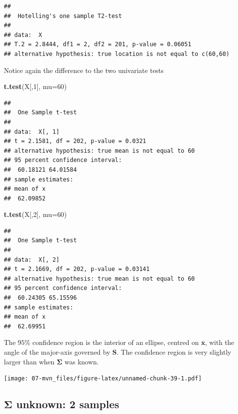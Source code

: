 \documentclass[]{book}
\newenvironment{Shaded}{\begin{snugshade}}{\end{snugshade}}
\newcommand{\DataTypeTok}[1]{\textcolor[rgb]{0.13,0.29,0.53}{#1}}
\newcommand{\DecValTok}[1]{\textcolor[rgb]{0.00,0.00,0.81}{#1}}
\newcommand{\KeywordTok}[1]{\textcolor[rgb]{0.13,0.29,0.53}{\textbf{#1}}}
\newcommand{\NormalTok}[1]{#1}
\theoremstyle{definition}
\theoremstyle{definition}
\theoremstyle{definition}
\theoremstyle{remark}
\begin{document}
\begin{verbatim}
## 
##  Hotelling's one sample T2-test
## 
## data:  X
## T.2 = 2.8444, df1 = 2, df2 = 201, p-value = 0.06051
## alternative hypothesis: true location is not equal to c(60,60)
\end{verbatim}

Notice again the difference to the two univariate tests

\begin{Shaded}
\begin{Highlighting}[]
\KeywordTok{t.test}\NormalTok{(X[,}\DecValTok{1}\NormalTok{], }\DataTypeTok{mu=}\DecValTok{60}\NormalTok{)}
\end{Highlighting}
\end{Shaded}

\begin{verbatim}
## 
##  One Sample t-test
## 
## data:  X[, 1]
## t = 2.1581, df = 202, p-value = 0.0321
## alternative hypothesis: true mean is not equal to 60
## 95 percent confidence interval:
##  60.18121 64.01584
## sample estimates:
## mean of x 
##  62.09852
\end{verbatim}

\begin{Shaded}
\begin{Highlighting}[]
\KeywordTok{t.test}\NormalTok{(X[,}\DecValTok{2}\NormalTok{], }\DataTypeTok{mu=}\DecValTok{60}\NormalTok{)}
\end{Highlighting}
\end{Shaded}

\begin{verbatim}
## 
##  One Sample t-test
## 
## data:  X[, 2]
## t = 2.1669, df = 202, p-value = 0.03141
## alternative hypothesis: true mean is not equal to 60
## 95 percent confidence interval:
##  60.24305 65.15596
## sample estimates:
## mean of x 
##  62.69951
\end{verbatim}

The \(95\)\% confidence region is the interior of an ellipse, centred on \(\bar{\mathbf x}\), with the angle of the major-axis governed by \(\mathbf S\). The confidence region is very slightly larger than when \(\boldsymbol{\Sigma}\) was known.

\texttt{[image: 07-mvn\_files/figure-latex/unnamed-chunk-39-1.pdf]}

\hypertarget{boldsymbolsigma-unknown-2-samples}{%
\subsection{\texorpdfstring{\(\boldsymbol{\Sigma}\) unknown: 2 samples}{\textbackslash{}boldsymbol\{\textbackslash{}Sigma\} unknown: 2 samples}}\label{boldsymbolsigma-unknown-2-samples}}
\end{document}
